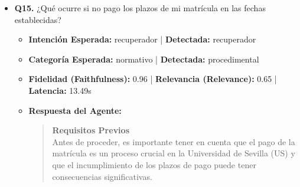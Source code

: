 \documentclass[12pt,a4paper,oneside]{report}
\begin{document}
\begin{itemize}
  
\item \textbf{Q15.} ¿Qué ocurre si no pago los plazos de mi matrícula en las fechas establecidas? \\
        \begin{itemize}
          \item \textbf{Intención Esperada:} recuperador | \textbf{Detectada:} recuperador
          \item \textbf{Categoría Esperada:} normativo | \textbf{Detectada:} procedimental
          \item \textbf{Fidelidad (Faithfulness):} 0.96 | \textbf{Relevancia (Relevance):} 0.65 | \textbf{Latencia:} 13.49s
          \item \textbf{{Respuesta del Agente:}} \\
                \begin{quote}

\noindent\textbf{Requisitos Previos}\\
Antes de proceder, es importante tener en cuenta que el pago de la matrícula es un proceso crucial en la Universidad de Sevilla (US) y que el incumplimiento de los plazos de pago puede tener consecuencias significativas.



\end{quote}
\end{itemize}
\end{itemize}
\end{document}
